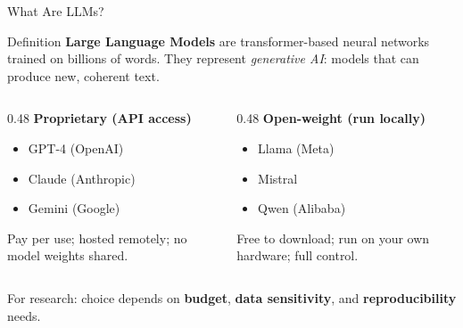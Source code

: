 \documentclass[aspectratio=169]{beamer}
\begin{document}
\begin{frame}{What Are LLMs?}
    \begin{block}{Definition}
        \textbf{Large Language Models} are transformer-based neural networks trained on billions of words. They represent \textit{generative AI}: models that can produce new, coherent text.
    \end{block}

    \begin{columns}[T]
        \begin{column}{0.48\textwidth}
            \textbf{\color{sgsssMagenta} Proprietary (API access)}
            \begin{itemize}\setlength\itemsep{0pt}
                \item {} GPT-4 (OpenAI)
                \item {} Claude (Anthropic)
                \item {} Gemini (Google)
            \end{itemize}
            {\footnotesize Pay per use; hosted remotely; no model weights shared.}
        \end{column}
        \begin{column}{0.48\textwidth}
            \textbf{\color{sgsssGreen} Open-weight (run locally)}
            \begin{itemize}\setlength\itemsep{0pt}
                \item {} Llama (Meta)
                \item {} Mistral
                \item {} Qwen (Alibaba)
            \end{itemize}
            {\footnotesize Free to download; run on your own hardware; full control.}
        \end{column}
    \end{columns}

    \vspace{0.2cm}
    {\small {} For research: choice depends on \textbf{budget}, \textbf{data sensitivity}, and \textbf{reproducibility} needs.}
\end{frame}
\end{document}
